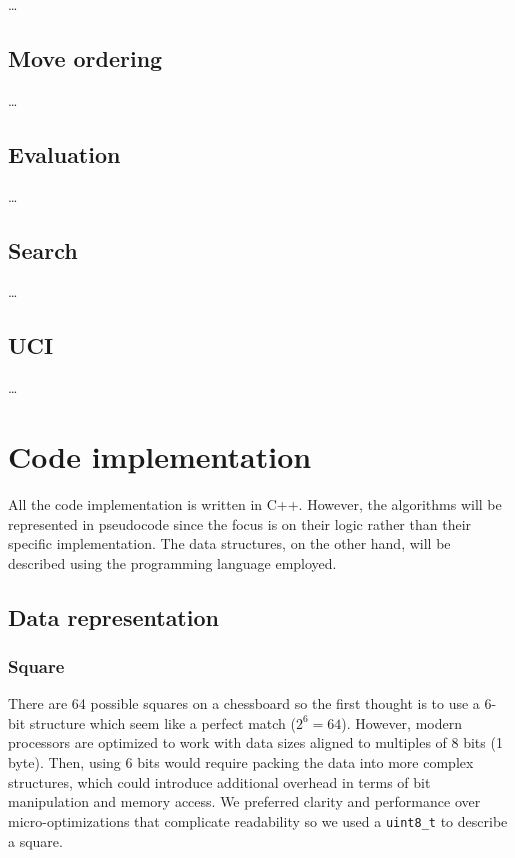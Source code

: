 \ldots

\subsection{Move ordering}

\ldots

\subsection{Evaluation}

\ldots

\subsection{Search}

\ldots

\subsection{UCI}

\ldots

\section{Code implementation}
\label{sec:code}

All the code implementation is written in C++. However, the algorithms will be represented in pseudocode since the focus is on their logic rather than their specific implementation. The data structures, on the other hand, will be described using the programming language employed.

\subsection{Data representation}

\subsubsection{Square}

There are 64 possible squares on a chessboard so the first thought is to use a 6-bit structure which seem like a perfect match ($2^6 = 64$). However, modern processors are optimized to work with data sizes aligned to multiples of 8 bits (1 byte). Then, using 6 bits would require packing the data into more complex structures, which could introduce additional overhead in terms of bit manipulation and memory access. We preferred clarity and performance over micro-optimizations that complicate readability so we used a \texttt{uint8\_t} to describe a square.


